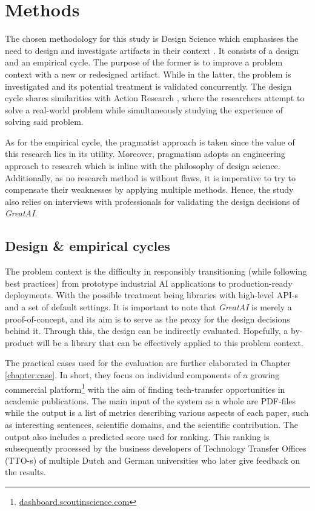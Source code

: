 \chapter{Methods} \label{chapter:methods}

The chosen methodology for this study is Design Science which emphasises the need to design and investigate artifacts in their context \cite{wieringa2014design}. It consists of a design and an empirical cycle. The purpose of the former is to improve a problem context with a new or redesigned artifact. While in the latter, the problem is investigated and its potential treatment is validated concurrently. The design cycle shares similarities with Action Research \cite{davison2004principles}, where the researchers attempt to solve a real-world problem while simultaneously studying the experience of solving said problem. 

As for the empirical cycle, the pragmatist approach is taken since the value of this research lies in its utility. Moreover, pragmatism adopts an engineering approach to research \cite{shull2007guide} which is inline with the philosophy of design science. Additionally, as no research method is without flaws, it is imperative to try to compensate their weaknesses by applying multiple methods. Hence, the study also relies on interviews with professionals for validating the design decisions of \textit{GreatAI}.

\section{Design \& empirical cycles}

The problem context is the difficulty in responsibly transitioning (while following best practices) from prototype industrial AI applications to production-ready deployments. With the possible treatment being libraries with high-level API-s and a set of default settings. It is important to note that \textit{GreatAI} is merely a proof-of-concept, and its aim is to serve as the proxy for the design decisions behind it. Through this, the design can be indirectly evaluated. Hopefully, a by-product will be a library that can be effectively applied to this problem context.

The practical cases used for the evaluation are further elaborated in Chapter \ref{chapter:case}. In short, they focus on individual components of a growing commercial platform\footnote{\href{https://dashboard.scoutinscience.com/}{dashboard.scoutinscience.com}} with the aim of finding tech-transfer opportunities in academic publications. The main input of the system as a whole are PDF-files while the output is a list of metrics describing various aspects of each paper, such as interesting sentences, scientific domains, and the scientific contribution. The output also includes a predicted score used for ranking. This ranking is subsequently processed by the business developers of Technology Transfer Offices (TTO-s) of multiple Dutch and German universities who later give feedback on the results.

